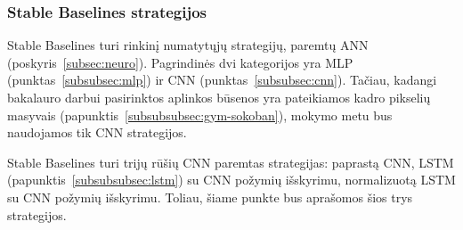 \documentclass{VUMIFPSbakalaurinis}
\begin{document}
\subsubsection{Stable Baselines strategijos}\label{subsubsec:policies}
{
	Stable Baselines turi rinkinį numatytųjų strategijų, paremtų ANN (poskyris~\ref{subsec:neuro}). Pagrindinės dvi kategorijos yra MLP (punktas~\ref{subsubsec:mlp}) ir CNN (punktas~\ref{subsubsec:cnn}). Tačiau, kadangi bakalauro darbui pasirinktos aplinkos būsenos yra pateikiamos kadro pikselių masyvais (papunktis~\ref{subsubsubsec:gym-sokoban}), mokymo metu bus naudojamos tik CNN strategijos.\par
	
	Stable Baselines turi trijų rūšių CNN paremtas strategijas: paprastą CNN, LSTM (papunktis~\ref{subsubsubsec:lstm}) su CNN požymių išskyrimu, normalizuotą LSTM su CNN požymių išskyrimu. Toliau, šiame punkte bus aprašomos šios trys strategijos.
}
\label{subsubsubsec:cnnpolicy}
\end{document}
